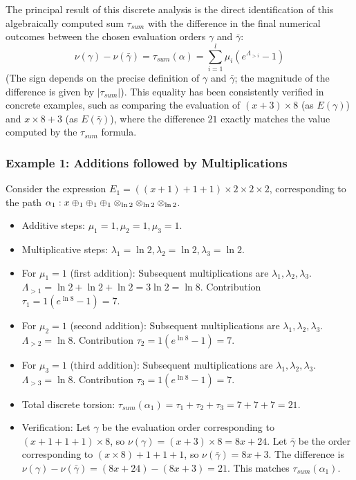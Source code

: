 The principal result of this discrete analysis is the direct identification of this algebraically computed sum $\tau_{sum}$ with the difference in the final numerical outcomes between the chosen evaluation orders $\gamma$ and $\bar{\gamma}$:
\begin{equation}
\nu(\gamma) - \nu(\bar{\gamma}) = \tau_{sum}(\alpha) = \sum_{i=1}^{l} \mu_i (e^{\Lambda_{>i}} - 1)
\label{eq:discrete_torsion_evaluation_equivalence}
\end{equation}
(The sign depends on the precise definition of $\gamma$ and $\bar{\gamma}$; the magnitude of the difference is given by $|\tau_{sum}|$). This equality has been consistently verified in concrete examples, such as comparing the evaluation of $(x+3)\times 8$ (as $E(\gamma)$) and $x\times 8 + 3$ (as $E(\bar{\gamma})$), where the difference $21$ exactly matches the value computed by the $\tau_{sum}$ formula.

\subsubsection*{Example 1: Additions followed by Multiplications}
Consider the expression $E_1 = ((x+1)+1+1) \times 2 \times 2 \times 2$, corresponding to the path $\alpha_1: x \oplus_{1} \oplus_{1} \oplus_{1} \otimes_{\ln 2} \otimes_{\ln 2} \otimes_{\ln 2}$.
\begin{itemize}
    \item Additive steps: $\mu_1=1, \mu_2=1, \mu_3=1$.
    \item Multiplicative steps: $\lambda_1=\ln 2, \lambda_2=\ln 2, \lambda_3=\ln 2$.
    \item For $\mu_1=1$ (first addition): Subsequent multiplications are $\lambda_1, \lambda_2, \lambda_3$. $\Lambda_{>1} = \ln 2 + \ln 2 + \ln 2 = 3\ln 2 = \ln 8$. Contribution $\tau_1 = 1(e^{\ln 8}-1) = 7$.
    \item For $\mu_2=1$ (second addition): Subsequent multiplications are $\lambda_1, \lambda_2, \lambda_3$. $\Lambda_{>2} = \ln 8$. Contribution $\tau_2 = 1(e^{\ln 8}-1) = 7$.
    \item For $\mu_3=1$ (third addition): Subsequent multiplications are $\lambda_1, \lambda_2, \lambda_3$. $\Lambda_{>3} = \ln 8$. Contribution $\tau_3 = 1(e^{\ln 8}-1) = 7$.
    \item Total discrete torsion: $\tau_{sum}(\alpha_1) = \tau_1 + \tau_2 + \tau_3 = 7+7+7 = 21$.
    \item Verification: Let $\gamma$ be the evaluation order corresponding to $(x+1+1+1) \times 8$, so $\nu({\gamma}) = (x+3) \times 8 = 8x+24$. Let $\bar{\gamma}$ be the order corresponding to $(x \times 8) + 1+1+1$, so $\nu({\bar{\gamma}}) = 8x+3$. The difference is $\nu({\gamma}) - \nu({\bar{\gamma}}) = (8x+24) - (8x+3) = 21$. This matches $\tau_{sum}(\alpha_1)$.
\end{itemize}

